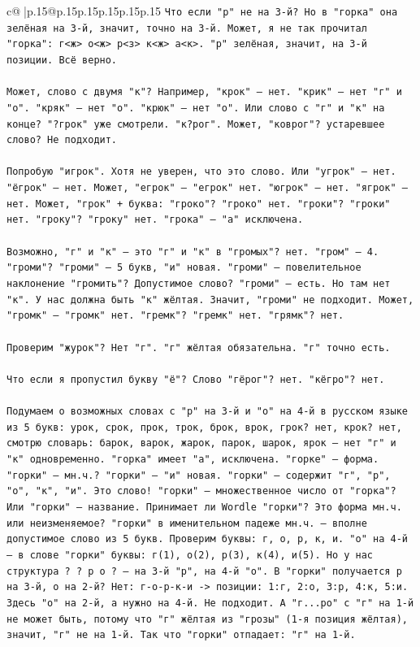 \documentclass{article}
\begin{document}
{\begin{supertabular}{c@{$\;$}|p{.15\linewidth}@{}p{.15\linewidth}p{.15\linewidth}p{.15\linewidth}p{.15\linewidth}p{.15\linewidth}}
{{{\texttt{Что если "р" не на 3{-}й? Но в "горка" она зелёная на 3{-}й, значит, точно на 3{-}й. Может, я не так прочитал "горка": г<ж> о<ж> р<з> к<ж> а<к>. "р" зелёная, значит, на 3{-}й позиции. Всё верно.} \\
\\ 
\texttt{Может, слово с двумя "к"? Например, "крок" — нет. "крик" — нет "г" и "о". "кряк" — нет "о". "крюк" — нет "о". Или слово с "г" и "к" на конце? "?грок" уже смотрели. "к?рог". Может, "коврог"? устаревшее слово? Не подходит.} \\
\\ 
\texttt{Попробую "игрок". Хотя не уверен, что это слово. Или "угрок" — нет. "ёгрок" — нет. Может, "егрок" — "егрок" нет. "югрок" — нет. "ягрок" — нет. Может, "грок" + буква: "гроко"? "гроко" нет. "гроки"? "гроки" нет. "гроку"? "гроку" нет. "грока" — "а" исключена.} \\
\\ 
\texttt{Возможно, "г" и "к" — это "г" и "к" в "громых"? нет. "гром" — 4. "громи"? "громи" — 5 букв, "и" новая. "громи" — повелительное наклонение "громить"? Допустимое слово? "громи" — есть. Но там нет "к". У нас должна быть "к" жёлтая. Значит, "громи" не подходит. Может, "громк" — "громк" нет. "гремк"? "гремк" нет. "грямк"? нет.} \\
\\ 
\texttt{Проверим "журок"? Нет "г". "г" жёлтая обязательна. "г" точно есть.} \\
\\ 
\texttt{Что если я пропустил букву "ё"? Слово "гёрог"? нет. "кёгро"? нет.} \\
\\ 
\texttt{Подумаем о возможных словах с "р" на 3{-}й и "о" на 4{-}й в русском языке из 5 букв: урок, срок, прок, трок, брок, врок, грок? нет, крок? нет, смотрю словарь: барок, варок, жарок, парок, шарок, ярок — нет "г" и "к" одновременно. "горка" имеет "а", исключена. "горке" — форма. "горки" — мн.ч.? "горки" — "и" новая. "горки" — содержит "г", "р", "о", "к", "и". Это слово! "горки" — множественное число от "горка"? Или "горки" — название. Принимает ли Wordle "горки"? Это форма мн.ч. или неизменяемое? "горки" в именительном падеже мн.ч. — вполне допустимое слово из 5 букв. Проверим буквы: г, о, р, к, и. "о" на 4{-}й — в слове "горки" буквы: г(1), о(2), р(3), к(4), и(5). Но у нас структура ? ? р о ? — на 3{-}й "р", на 4{-}й "о". В "горки" получается р на 3{-}й, о на 2{-}й? Нет: г{-}о{-}р{-}к{-}и {-}> позиции: 1:г, 2:о, 3:р, 4:к, 5:и. Здесь "о" на 2{-}й, а нужно на 4{-}й. Не подходит. А "г...ро" с "г" на 1{-}й не может быть, потому что "г" жёлтая из "грозы" (1{-}я позиция жёлтая), значит, "г" не на 1{-}й. Так что "горки" отпадает: "г" на 1{-}й.} \\
}}}
\end{supertabular}}
\end{document}
